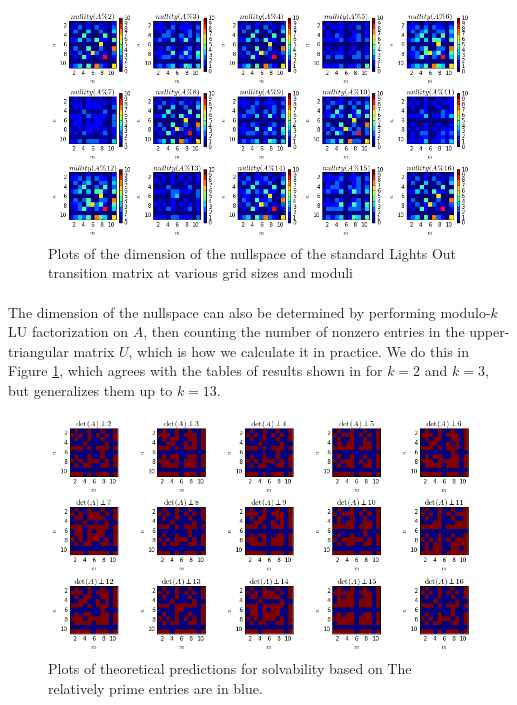 \documentclass[11pt]{article}
\begin{document}
\begin{figure}
\caption{Plots of the dimension of the nullspace of the standard Lights Out transition matrix at various grid sizes and moduli}
\label{nullity}
\includegraphics[width=\textwidth]{nullity.png}
\end{figure}

\paragraph{} The dimension of the nullspace can also be determined by performing modulo-$k$ LU factorization on $A$, then counting the number of nonzero entries in the upper-triangular matrix $U$, which is how we calculate it in practice. We do this in Figure \ref{nullity}, which agrees with the tables of results shown in \cite{jaap} for $k=2$ and $k=3$, but generalizes them up to $k=13$.

\begin{figure}
\caption{Plots of theoretical predictions for solvability based on \cite{involve}  The relatively prime entries are in blue.}
\label{relprime}
\includegraphics[width=\textwidth]{relprime.png}
\end{figure}
\end{document}

